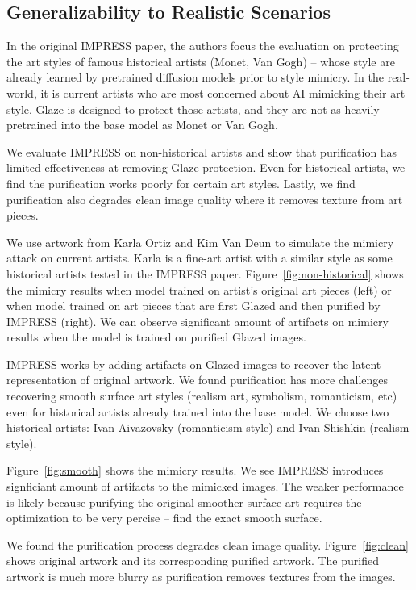 \subsection{Generalizability to Realistic Scenarios}

In the original IMPRESS paper, the authors focus the evaluation on protecting the
art styles of famous historical artists (Monet, Van Gogh) -- whose style are already learned
by pretrained diffusion models prior to style mimicry. In the real-world, it is current artists
who are most concerned about AI mimicking their art style. Glaze is designed
to protect those artists, and they are not as heavily pretrained into the
base model as Monet or Van Gogh. 

We evaluate IMPRESS on non-historical artists and show that purification
has limited effectiveness at removing Glaze protection. 
Even for historical artists, we find the purification works poorly for 
certain art styles. Lastly, we find purification also degrades clean image quality where
it removes texture from art pieces. 

 We use artwork from Karla 
Ortiz and Kim Van Deun to simulate the mimicry attack on current artists. Karla is a fine-art artist 
with a similar style as some historical artists tested in the IMPRESS paper. 
Figure~\ref{fig:non-historical}
shows the mimicry results when model trained on artist's original art pieces (left)
or when model trained on art pieces that are first Glazed
and then purified by IMPRESS (right). We can observe significant amount of 
artifacts on mimicry results when the model is trained on purified Glazed images. 

 IMPRESS works by adding artifacts
on Glazed images to recover the latent representation of original artwork. 
We found purification has more challenges recovering smooth surface 
art styles (realism art, symbolism, romanticism, etc) even for historical
artists already trained into the base model. 
We choose two historical artists: Ivan Aivazovsky (romanticism style) and Ivan Shishkin (realism style). 

Figure~\ref{fig:smooth} shows the mimicry results. We see IMPRESS 
introduces signficiant amount of artifacts to the mimicked images. 
The weaker performance is likely because purifying  the 
original smoother surface art requires the optimization to 
be very percise -- find the exact smooth surface. 

 We found the purification process degrades 
clean image quality. Figure~\ref{fig:clean} shows original artwork 
and its corresponding purified artwork. The purified artwork is much more
blurry as purification removes textures from the images. 

